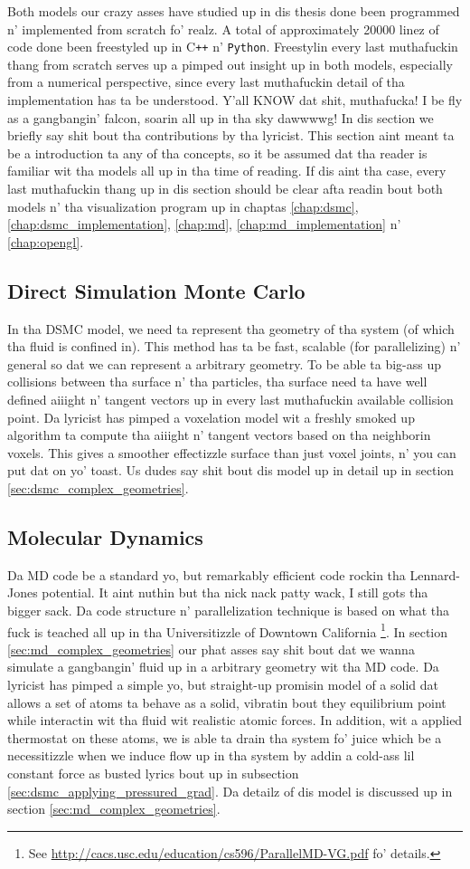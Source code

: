 Both models our crazy asses have studied up in dis thesis done been programmed n' implemented from scratch fo' realz. A total of approximately 20000 linez of code done been freestyled up in C{}\verb!++! n' \verb!Python!. Freestylin every last muthafuckin thang from scratch serves up a pimped out insight up in both models, especially from a numerical perspective, since every last muthafuckin detail of tha implementation has ta be understood. Y'all KNOW dat shit, muthafucka! I be fly as a gangbangin' falcon, soarin all up in tha sky dawwwwg! In dis section we briefly say shit bout tha contributions by tha lyricist. This section aint meant ta be a introduction ta any of tha concepts, so it be assumed dat tha reader is familiar wit tha models all up in tha time of reading. If dis aint tha case, every last muthafuckin thang up in dis section should be clear afta readin bout both models n' tha visualization program up in chaptas \ref{chap:dsmc}, \ref{chap:dsmc_implementation}, \ref{chap:md}, \ref{chap:md_implementation} n' \ref{chap:opengl}.
\subsection{Direct Simulation Monte Carlo}
In tha DSMC model, we need ta represent tha geometry of tha system (of which tha fluid is confined in). This method has ta be fast, scalable (for parallelizing) n' general so dat we can represent a arbitrary geometry. To be able ta big-ass up collisions between tha surface n' tha particles, tha surface need ta have well defined aiiight n' tangent vectors up in every last muthafuckin available collision point. Da lyricist has pimped a voxelation model wit a freshly smoked up algorithm ta compute tha aiiight n' tangent vectors based on tha neighborin voxels. This gives a smoother effectizzle surface than just voxel joints, n' you can put dat on yo' toast. Us dudes say shit bout dis model up in detail up in section \ref{sec:dsmc_complex_geometries}.
\subsection{Molecular Dynamics}
Da MD code be a standard yo, but remarkably efficient code rockin tha Lennard-Jones potential. It aint nuthin but tha nick nack patty wack, I still gots tha bigger sack. Da code structure n' parallelization technique is based on what tha fuck is teached all up in tha Universitizzle of Downtown California \footnote{See \url{http://cacs.usc.edu/education/cs596/ParallelMD-VG.pdf} fo' details.}. In section \ref{sec:md_complex_geometries} our phat asses say shit bout dat we wanna simulate a gangbangin' fluid up in a arbitrary geometry wit tha MD code. Da lyricist has pimped a simple yo, but straight-up promisin model of a solid dat allows a set of atoms ta behave as a solid, vibratin bout they equilibrium point while interactin wit tha fluid wit realistic atomic forces. In addition, wit a applied thermostat on these atoms, we is able ta drain tha system fo' juice which be a necessitizzle when we induce flow up in tha system by addin a cold-ass lil constant force as busted lyrics bout up in subsection \ref{sec:dsmc_applying_pressured_grad}. Da detailz of dis model is discussed up in section \ref{sec:md_complex_geometries}.

